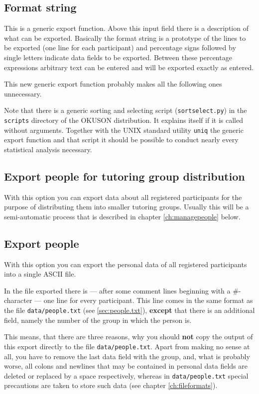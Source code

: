 \documentclass[12pt,openany,a4paper]{book}
\newcommand{\OKUSON}{\textsf{OKUSON}}
\begin{document}
\subsection{Format string}

This is a generic export function. Above this input field there is
a description of what can be exported. Basically the format string is
a prototype of the lines to be exported (one line for each participant) and
percentage signs followed by single letters indicate data fields to be
exported. Between these percentage expressions arbitrary text can be
entered and will be exported exactly as entered.

This new generic export function probably makes all the following ones
unnecessary.

Note that there is a generic sorting and selecting script
(\texttt{sortselect.py}) in the \texttt{scripts} directory of the
{\OKUSON} distribution. It explains itself if it is called without
arguments. Together with the UNIX standard utility \texttt{uniq} the
generic export function and that script it should be possible to conduct
nearly every statistical analysis necessary.

\subsection{Export people for tutoring group distribution} 
\label{sec:exppeotut}

With this option
you can export data about all registered participants for the purpose of
distributing them into smaller tutoring groups. Usually this will be 
a semi-automatic process that is described in chapter \ref{ch:managepeople}
below.

\subsection{Export people} 

With this option you can export the personal
data of all registered participants into a single ASCII file.

In the file exported there is --- after some comment
lines beginning with a \#-character --- one line for every participant.
This line comes in the same format as the file \texttt{data/people.txt}
(see \ref{sec:people.txt}), \textbf{except} that there is an additional
field, namely the number of the group in which the person is.

This means, that there are three reasons, why you should \textbf{not} copy
the output of this export directly to the file \texttt{data/people.txt}.
Apart from making no sense at all, you have to remove the last data field
with the group, and, what is probably worse, all colons and newlines that
may be contained in personal data fields are deleted or replaced by a 
space respectively, whereas in \texttt{data/people.txt} special precautions
are taken to store such data (see chapter \ref{ch:fileformats}).
\end{document}
